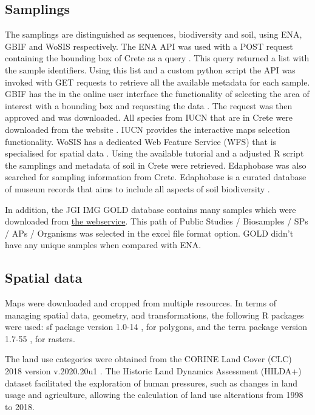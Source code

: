 \subsection{Samplings}\label{crete_samplings}

The samplings are distinguished as sequences, biodiversity and soil, using ENA, GBIF and WoSIS respectively.
The ENA API was used with a POST request containing the bounding box of Crete as a query \parencite{Yuan2023}. This 
query returned a list with the sample identifiers. Using this list and a custom python script the API
was invoked with GET requests to retrieve all the available metadata for each sample.
GBIF has the in the online user interface the functionality of selecting the area of interest with a bounding box and requesting
the data \parencite{noauthor_gbif_nodate}. The request was then approved and was downloaded. All species 
from IUCN that are in Crete were downloaded from the website \parencite{iucn2024}. IUCN provides the 
interactive maps selection functionality. 
WoSIS has a dedicated Web Feature Service (WFS) that is specialised for spatial data \parencite{Batjes2024}. 
Using the available tutorial and a adjusted R script the samplings and metadata of 
soil in Crete were retrieved.
Edaphobase was also searched for sampling information from Crete. Edaphobase is
a curated database of museum records that aims to include all aspects of soil biodiversity \parencite{BURKHARDT20143}.

In addition, the JGI IMG GOLD database contains many samples which were downloaded from \href{https://gold.jgi.doe.gov/downloads}{the webservice}.
This path of Public Studies / Biosamples / SPs / APs / Organisms was selected in the excel file format option. 
GOLD didn't have any unique samples when compared with ENA.

\subsection{Spatial data}\label{crete_spatial}

Maps were downloaded and cropped from multiple resources.
In terms of managing spatial data, geometry, and transformations, the following
R packages were used:
sf package version 1.0-14 \parencite{Pebesma2023}, for polygons, and the terra
package version 1.7-55 \parencite{hijmans2024terra}, for rasters.

The land use categories were obtained from the CORINE Land Cover (CLC) 2018
version v.2020.20u1 \parencite{CLC2023}.
The Historic Land Dynamics Assessment (HILDA+) dataset \parencite{winkler2021global}
facilitated the exploration of human pressures, such as changes in land usage and agriculture,
allowing the calculation of land use alterations from 1998 to 2018.

